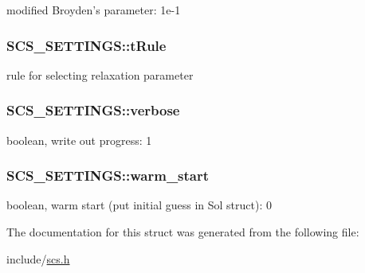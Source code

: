 modified Broyden's parameter\-: 1e-\/1 \hypertarget{struct_s_c_s___s_e_t_t_i_n_g_s_a3dc42bc0693d4e530b4d756299b118df}{
\subsubsection[{t\-Rule}]{ S\-C\-S\-\_\-\-S\-E\-T\-T\-I\-N\-G\-S\-::t\-Rule}}\label{struct_s_c_s___s_e_t_t_i_n_g_s_a3dc42bc0693d4e530b4d756299b118df}
rule for selecting relaxation parameter \hypertarget{struct_s_c_s___s_e_t_t_i_n_g_s_a6f332a476fcf237bfc3ebc99124a24ae}{
\subsubsection[{verbose}]{ S\-C\-S\-\_\-\-S\-E\-T\-T\-I\-N\-G\-S\-::verbose}}\label{struct_s_c_s___s_e_t_t_i_n_g_s_a6f332a476fcf237bfc3ebc99124a24ae}
boolean, write out progress\-: 1 \hypertarget{struct_s_c_s___s_e_t_t_i_n_g_s_a38a4b68bc0363f4dd0737ae5621388ae}{
\subsubsection[{warm\-\_\-start}]{ S\-C\-S\-\_\-\-S\-E\-T\-T\-I\-N\-G\-S\-::warm\-\_\-start}}\label{struct_s_c_s___s_e_t_t_i_n_g_s_a38a4b68bc0363f4dd0737ae5621388ae}
boolean, warm start (put initial guess in Sol struct)\-: 0 

The documentation for this struct was generated from the following file\-:\begin{DoxyCompactItemize}
\item 
include/\hyperlink{scs_8h}{scs.\-h}\end{DoxyCompactItemize}
